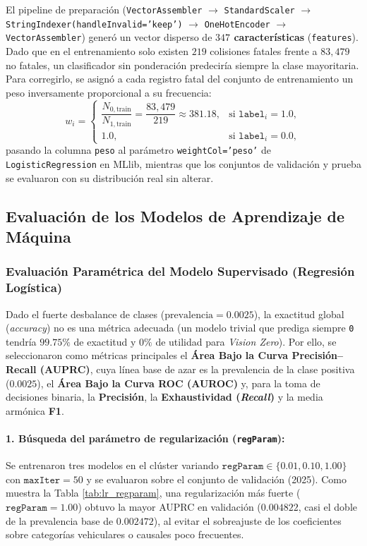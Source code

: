El pipeline de preparación (\texttt{VectorAssembler} $\rightarrow$ \texttt{StandardScaler} $\rightarrow$ \texttt{StringIndexer(handleInvalid='keep')} $\rightarrow$ \texttt{OneHotEncoder} $\rightarrow$ \texttt{VectorAssembler}) generó un vector disperso de \textbf{$347$ características} (\texttt{features}). Dado que en el entrenamiento solo existen $219$ colisiones fatales frente a $83,479$ no fatales, un clasificador sin ponderación predeciría siempre la clase mayoritaria. Para corregirlo, se asignó a cada registro fatal del conjunto de entrenamiento un peso inversamente proporcional a su frecuencia:
\[
w_i = \begin{cases}
\dfrac{N_{0,\text{train}}}{N_{1,\text{train}}} = \dfrac{83{,}479}{219} \approx 381.18, & \text{si } \texttt{label}_i = 1.0, \\[8pt]
1.0, & \text{si } \texttt{label}_i = 0.0,
\end{cases}
\]
pasando la columna \texttt{peso} al parámetro \texttt{weightCol='peso'} de \texttt{LogisticRegression} en MLlib, mientras que los conjuntos de validación y prueba se evaluaron con su distribución real sin alterar.

\subsection{Evaluación de los Modelos de Aprendizaje de Máquina}
\label{subsec:evaluacion_modelos_num6}

\subsubsection{Evaluación Paramétrica del Modelo Supervisado (Regresión Logística)}

Dado el fuerte desbalance de clases ($\text{prevalencia} = 0.0025$), la exactitud global (\textit{accuracy}) no es una métrica adecuada (un modelo trivial que prediga siempre \texttt{0} tendría $99.75\%$ de exactitud y $0\%$ de utilidad para \textit{Vision Zero}). Por ello, se seleccionaron como métricas principales el \textbf{Área Bajo la Curva Precisión--Recall (AUPRC)}, cuya línea base de azar es la prevalencia de la clase positiva ($0.0025$), el \textbf{Área Bajo la Curva ROC (AUROC)} y, para la toma de decisiones binaria, la \textbf{Precisión}, la \textbf{Exhaustividad (\textit{Recall})} y la media armónica \textbf{F1}.

\paragraph{1. Búsqueda del parámetro de regularización (\texttt{regParam}):}
Se entrenaron tres modelos en el clúster variando $\texttt{regParam} \in \{0.01, 0.10, 1.00\}$ con $\texttt{maxIter} = 50$ y se evaluaron sobre el conjunto de validación (2025). Como muestra la Tabla \ref{tab:lr_regparam}, una regularización más fuerte ($\texttt{regParam} = 1.00$) obtuvo la mayor AUPRC en validación ($0.004822$, casi el doble de la prevalencia base de $0.002472$), al evitar el sobreajuste de los coeficientes sobre categorías vehiculares o causales poco frecuentes.

